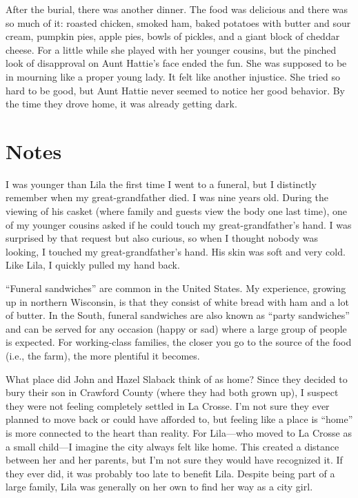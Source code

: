\documentclass[
  letterpaper,
]{book}
\begin{document}
After the burial, there was another dinner. The food was delicious and
there was so much of it: roasted chicken, smoked ham, baked potatoes
with butter and sour cream, pumpkin pies, apple pies, bowls of pickles,
and a giant block of cheddar cheese. For a little while she played with
her younger cousins, but the pinched look of disapproval on Aunt
Hattie's face ended the fun. She was supposed to be in mourning like a
proper young lady. It felt like another injustice. She tried so hard to
be good, but Aunt Hattie never seemed to notice her good behavior. By
the time they drove home, it was already getting dark.

\section{Notes}\label{notes-14}

I was younger than Lila the first time I went to a funeral, but I
distinctly remember when my great-grandfather died. I was nine years
old. During the viewing of his casket (where family and guests view the
body one last time), one of my younger cousins asked if he could touch
my great-grandfather's hand. I was surprised by that request but also
curious, so when I thought nobody was looking, I touched my
great-grandfather's hand. His skin was soft and very cold. Like Lila, I
quickly pulled my hand back.

``Funeral sandwiches'' are common in the United States. My experience,
growing up in northern Wisconsin, is that they consist of white bread
with ham and a lot of butter. In the South, funeral sandwiches are also
known as ``party sandwiches'' and can be served for any occasion (happy
or sad) where a large group of people is expected. For working-class
families, the closer you go to the source of the food (i.e., the farm),
the more plentiful it becomes.

What place did John and Hazel Slaback think of as home? Since they
decided to bury their son in Crawford County (where they had both grown
up), I suspect they were not feeling completely settled in La Crosse.
I'm not sure they ever planned to move back or could have afforded to,
but feeling like a place is ``home'' is more connected to the heart than
reality. For Lila---who moved to La Crosse as a small child---I imagine
the city always felt like home. This created a distance between her and
her parents, but I'm not sure they would have recognized it. If they
ever did, it was probably too late to benefit Lila. Despite being part
of a large family, Lila was generally on her own to find her way as a
city girl.
\end{document}
